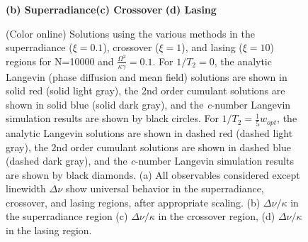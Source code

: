 \documentclass[aps,
twocolumn,
superscriptaddress,groupedaddress]{revtex4}
\begin{document}
\begin{figure}
\begin{center}
	\hspace{-10mm}\textbf{(b) Superradiance}\hspace{33mm}\textbf{(c) Crossover}
  \hspace{37mm}\textbf{(d) Lasing}
\end{center}
		\vspace{-5mm}
\caption{(Color online) Solutions using the various methods in the
superradiance ($\xi=0.1$), crossover ($\xi=1$), and lasing ($\xi=10$)
regions for N=10000 and $\frac{\Omega^2}{\kappa \gamma}=0.1$. For
$1/T_2=0$, the analytic Langevin (phase diffusion and mean field)
solutions are shown in solid red (solid light gray), the 2nd order
cumulant solutions are shown in solid blue (solid dark gray), and the
{\it c}-number Langevin simulation results are shown by black circles.
For $1/T_2=\frac{1}{5} w_{opt}$, the analytic Langevin solutions are
shown in dashed red (dashed light gray), the 2nd order cumulant
solutions are shown in dashed blue (dashed dark gray), and the {\it
c}-number Langevin simulation results are shown by black diamonds. (a)
All observables considered except linewidth  $\Delta \nu$ show universal
behavior in the superradiance, crossover, and lasing regions, after
appropriate scaling.  (b)  $\Delta \nu / \kappa$ in the superradiance
region (c) $\Delta \nu / \kappa$ in the crossover region, (d) $\Delta
\nu / \kappa$ in the lasing region.}
 \label{N10000Comparison}
\end{figure}
\end{document}

